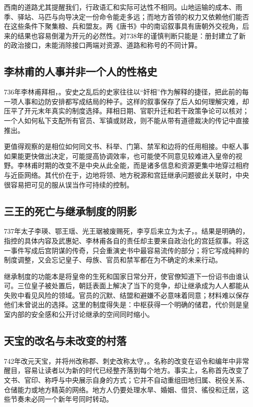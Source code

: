 西南的道路尤其提醒我们，行政语汇和实际可达性不相同。山地运输的成本、雨季、驿站、马匹与向导决定一份命令能走多远；而地方首领的权力又依赖他们能否在这些条件下聚集粮、兵和盟友。两《唐书》中的南诏叙事具有唐朝外交视角，后来的结果也容易倒灌为开元的必然性。对738年的谨慎判断只能是：册封建立了新的政治接口，未能消除接口两端对资源、道路和称号的不同计算。

\subsection{李林甫的人事并非一个人的性格史}
736年李林甫拜相，。安史之乱后的史家往往以“奸相”作为解释的捷径，把此前的每一项人事和边防安排都写成结局的种子。这样的叙事保存了后人如何理解灾难，却压平了开元末年真实的制度选择。拜相日期、官职升迁和若干政策争论可以核对；一个人如何私下支配所有官员、军镇或财政，则不能从带有道德裁决的传记中直接推出。

更值得观察的是相位如何同文书、科举、门第、禁军和边将的任用相接。中枢人事如果能更快做出决定，可能提高协调效率，也可能使不同意见较难进入皇帝的视野。李林甫时期的改变不是中央从此全能，而是诸多信息和资源更集中地穿过相府与近臣网络。其代价在于，边地将领、地方税源和宫廷继承问题彼此关联时，中央很容易把可见的服从误当作可持续的控制。

\subsection{三王的死亡与继承制度的阴影}
737年太子李瑛、鄂王瑶、光王琚被废赐死，李亨后来立为太子，。结果是明确的，指控的具体内容及武惠妃、李林甫各自的责任却主要来自政治化的宫廷叙事。将这一事件写成后宫阴谋的传奇，只会重演史书中最容易流传的部分；将它写成纯粹的制度调整，又会忘记皇子、母族、官员和禁军都在为不确定的未来行动。

继承制度的功能本是将皇帝的生死和国家日常分开，使官僚知道下一份诏书由谁认可。三位皇子被处置后，朝廷表面上解决了当下的竞争，却让继承成为人人都能从失败中看见风险的领域。官员的沉默、结盟和避嫌不必意味着同意；材料难以保存他们未曾说出的选择。这里的制度得失是：中枢获得一个明确的储君，代价则是皇室内部的安全感和公开讨论继承的空间同时缩小。

\subsection{天宝的改名与未改变的村落}
742年改元天宝，并将州改称郡、刺史改称太守，。名称的改变在诏令和编年中非常醒目，容易让读者以为新的时代已经整齐落到每个地方。事实上，名称首先改变了文书、官印、称呼与中央展示自身的方式；它并不自动重组田地归属、税役关系、仓储能力或地方精英的网络。地方人仍要处理水旱、婚姻、借贷、徭役和迁居，这些节奏未必同一个新年号同时转动。

